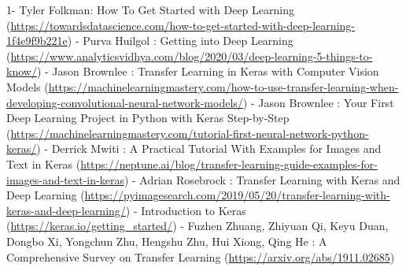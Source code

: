 \documentclass[12pt,a4paper]{article}
\begin{document}
1- Tyler Folkman: How To Get Started with Deep Learning 
 \newline(\url{https://towardsdatascience.com/how-to-get-started-with-deep-learning-1f4e9f9b221e})
 \linebreak
{}- Purva Huilgol : Getting into Deep Learning \newline (\url{https://www.analyticsvidhya.com/blog/2020/03/deep-learning-5-things-to-know/})
\linebreak
{}- Jason Brownlee : Transfer Learning in Keras with Computer Vision Models (\url{https://machinelearningmastery.com/how-to-use-transfer-learning-when-developing-convolutional-neural-network-models/})
\linebreak
{}- Jason Brownlee : Your First Deep Learning Project in Python with Keras Step-by-Step \newline (\url{https://machinelearningmastery.com/tutorial-first-neural-network-python-keras/})
\linebreak
{}- Derrick Mwiti : A Practical Tutorial With Examples for Images and Text in Keras \newline (\url{https://neptune.ai/blog/transfer-learning-guide-examples-for-images-and-text-in-keras})
\linebreak
{}- Adrian Rosebrock : Transfer Learning with Keras and Deep Learning \newline (\url{https://pyimagesearch.com/2019/05/20/transfer-learning-with-keras-and-deep-learning/})
\linebreak
{}- Introduction to Keras \newline (\url{https://keras.io/getting_started/})
\linebreak
{}- Fuzhen Zhuang, Zhiyuan Qi, Keyu Duan, Dongbo Xi, Yongchun Zhu, Hengshu Zhu, Hui Xiong, Qing He : A Comprehensive Survey on Transfer Learning \newline(\url{https://arxiv.org/abs/1911.02685})



%
%


\pagebreak
\end{document}
